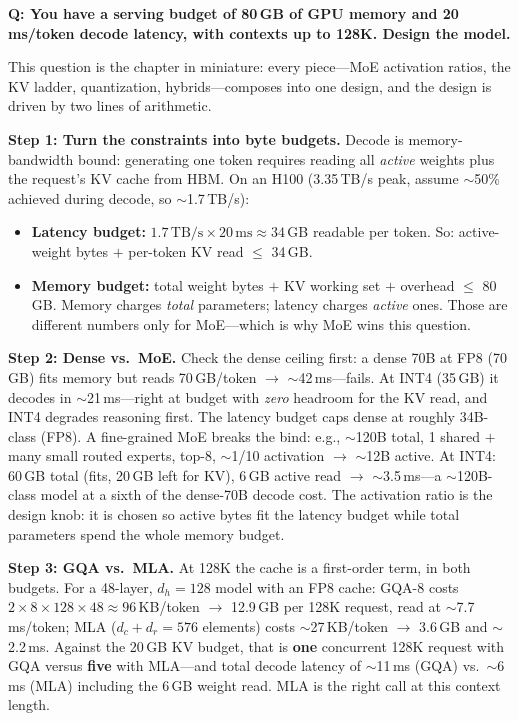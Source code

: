 \begin{interviewq}
\textbf{Q: You have a serving budget of 80\,GB of GPU memory and 20\,ms/token decode latency, with contexts up to 128K. Design the model.}

 \quad {} \quad \badgefreq{\freqhigh}

\stronganswer

This question is the chapter in miniature: every piece---MoE activation ratios, the KV ladder, quantization, hybrids---composes into one design, and the design is driven by two lines of arithmetic.

\textbf{Step 1: Turn the constraints into byte budgets.} Decode is memory-bandwidth bound: generating one token requires reading all \textit{active} weights plus the request's KV cache from HBM. On an H100 (3.35\,TB/s peak, assume $\sim$50\% achieved during decode, so $\sim$1.7\,TB/s):
\begin{itemize}
    \item \textbf{Latency budget:} $1.7\,\text{TB/s} \times 20\,\text{ms} \approx 34$\,GB readable per token. So: active-weight bytes $+$ per-token KV read $\leq$ 34\,GB.
    \item \textbf{Memory budget:} total weight bytes $+$ KV working set $+$ overhead $\leq$ 80\,GB. Memory charges \textit{total} parameters; latency charges \textit{active} ones. Those are different numbers only for MoE---which is why MoE wins this question.
\end{itemize}

\textbf{Step 2: Dense vs.\ MoE.} Check the dense ceiling first: a dense 70B at FP8 (70\,GB) fits memory but reads 70\,GB/token $\to$ $\sim$42\,ms---fails. At INT4 (35\,GB) it decodes in $\sim$21\,ms---right at budget with \textit{zero} headroom for the KV read, and INT4 degrades reasoning first. The latency budget caps dense at roughly 34B-class (FP8). A fine-grained MoE breaks the bind: e.g., $\sim$120B total, 1 shared $+$ many small routed experts, top-8, $\sim$1/10 activation $\to$ $\sim$12B active. At INT4: 60\,GB total (fits, 20\,GB left for KV), 6\,GB active read $\to$ $\sim$3.5\,ms---a $\sim$120B-class model at a sixth of the dense-70B decode cost. The activation ratio is the design knob: it is chosen so active bytes fit the latency budget while total parameters spend the whole memory budget.

\textbf{Step 3: GQA vs.\ MLA.} At 128K the cache is a first-order term, in both budgets. For a 48-layer, $d_h = 128$ model with an FP8 cache: GQA-8 costs $2 \times 8 \times 128 \times 48 \approx 96$\,KB/token $\to$ 12.9\,GB per 128K request, read at $\sim$7.7\,ms/token; MLA ($d_c + d_r = 576$ elements) costs $\sim$27\,KB/token $\to$ 3.6\,GB and $\sim$2.2\,ms. Against the 20\,GB KV budget, that is \textbf{one} concurrent 128K request with GQA versus \textbf{five} with MLA---and total decode latency of $\sim$11\,ms (GQA) vs.\ $\sim$6\,ms (MLA) including the 6\,GB weight read. MLA is the right call at this context length.


\end{interviewq}
